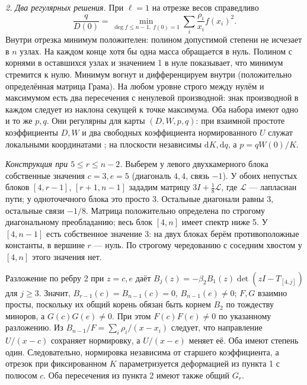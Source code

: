 \documentclass[11pt,a4paper]{article}
\newcommand{\dd}{\mathrm d}
\begin{document}
\smallskip\noindent\textit{2. Два регулярных решения.}
При \(\ell=1\) на отрезке весов справедливо \cite[лемма 3]{v2}
\[
 \frac{q}{D(0)}=\min_{\deg f\le n-1,\ f(0)=1}
                          \sum_i\frac{\rho_i}{x_i} f(x_i)^2 .
\]
Внутри отрезка минимум положителен: полином допустимой степени не исчезает в \(n\) узлах. На каждом конце хотя бы одна масса обращается в нуль. Полином с корнями в оставшихся узлах и значением 1 в нуле показывает, что минимум стремится к нулю. Минимум вогнут и дифференцируем внутри (положительно определённая матрица Грама). На любом уровне строго между нулём и максимумом есть два пересечения с ненулевой производной: знак производной в каждом следует из наклона секущей к точке максимума. Оба набора имеют одно и то же \(p,q\). Они регулярны для карты \((D,W,p,q)\): при взаимной простоте коэффициенты \(D,W\) и два свободных коэффициента нормированного \(U\) служат локальными координатами \cite[лемма 2]{v2}; на плоскости независимы \(\dd K,\dd q\), а \(p=qW(0)/K\).

\smallskip\noindent\textit{Конструкция при \(5\le r\le n-2\).}
Выберем у левого двухкамерного блока собственные значения \(c=3,e=5\) (диагональ \(4,4\), связь \(-1\)). У обоих непустых блоков \([4,r-1]\), \([r+1,n-1]\) зададим матрицу \(3I+\tfrac18\mathcal L\), где \(\mathcal L\) --- лапласиан пути; у одноточечного блока это просто \(3\). Остальные диагонали равны 3, остальные связи \(-1/8\). Матрица положительно определена по строгому диагональному преобладанию; весь блок \([4,n]\) имеет спектр ниже 5. У \([4,n-1]\) есть собственное значение 3: на двух блоках берём противоположные константы, в вершине \(r\) --- нуль. По строгому чередованию с соседним хвостом у \([4,n]\) этого значения нет.

\newpage
Разложение по ребру 2 при \(z=c,e\) даёт
\(B_j(z)=-\beta_2 B_1(z)\det(zI-T_{[4,j]})\) для \(j\ge3\).
Значит, \(B_{r-1}(c)=B_{n-1}(c)=0\), \(B_{n-1}(e)\ne0\); \(F,G\) взаимно просты, поскольку их общий корень обязан быть корнем \(B_2\) по тождеству миноров, а \(G(c)G(e)\ne0\). При этом \(F(c)F(e)\ne0\) по указанному разложению. Из \(B_{n-1}/F=\sum_i\rho_i/(x-x_i)\) следует, что направление \(U/(x-c)\) сохраняет нормировку, а \(U/(x-e)\) меняет её. Оба имеют степень один. Следовательно, нормировка независима от старшего коэффициента, а отрезок при фиксированном \(K\) параметризуется деформацией из пункта 1 с полюсом \(c\). Оба пересечения из пункта 2 имеют также общий \(G_r\).
\end{document}

